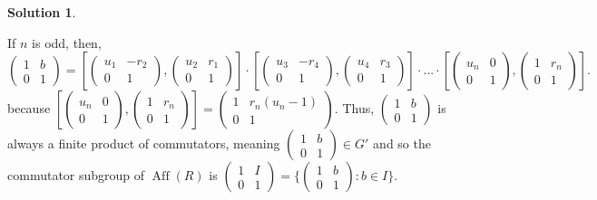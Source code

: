 \documentclass[10pt]{article}
\newcommand{\Aff}{\operatorname{Aff}}
\theoremstyle{Theorem}
\theoremstyle{definition}
\newtheorem{sol}{Solution}
\theoremstyle{remark}
\theoremstyle{custom}
\begin{document}
\begin{sol}
\begin{description}
If $n$ is odd, then, 
\[(\begin{smallmatrix}1&b\\0&1\end{smallmatrix})= [(\begin{smallmatrix}u_1&-r_2\\0&1\end{smallmatrix}),(\begin{smallmatrix}u_2&r_1\\0&1\end{smallmatrix})]\cdot
[(\begin{smallmatrix}u_3&-r_4\\0&1\end{smallmatrix}),(\begin{smallmatrix}u_4&r_3\\0&1\end{smallmatrix})]\cdot ... \cdot [(\begin{smallmatrix}u_n&0\\0&1\end{smallmatrix}),(\begin{smallmatrix}1&r_{n}\\0&1\end{smallmatrix})].       \]
because $[(\begin{smallmatrix}u_n&0\\0&1\end{smallmatrix}),(\begin{smallmatrix}1&r_{n}\\0&1\end{smallmatrix})]=(\begin{smallmatrix}1&r_n(u_n-1)\\0&1\end{smallmatrix})$. Thus, $(\begin{smallmatrix}1&b\\0&1\end{smallmatrix})$ is always a finite product of commutators, meaning $(\begin{smallmatrix}1&b\\0&1\end{smallmatrix})\in G'$ and so the commutator subgroup of $\Aff(R)$ is $(\begin{smallmatrix}1&I\\0&1\end{smallmatrix}) = 
\{(\begin{smallmatrix}1&b\\0&1\end{smallmatrix}) : b \in I\}$. 

\end{description}
\end{sol}
\end{document}
